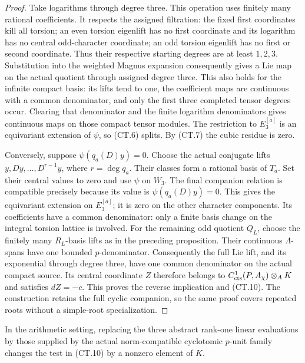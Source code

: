 \begin{proof}
Take logarithms through degree three. This operation uses finitely
many rational coefficients. It respects the assigned filtration:
the fixed first coordinates kill all torsion; an even torsion
eigenlift has no first coordinate and its logarithm has no central
odd-character coordinate; an odd torsion eigenlift has no first
or second coordinate. Thus their respective starting degrees are
at least \(1,2,3\). Substitution into the weighted Magnus
expansion consequently gives a Lie map on the actual quotient
through assigned degree three. This also holds for the infinite
compact basis: its lifts tend to one, the coefficient maps are
continuous with a common denominator, and only the first three
completed tensor degrees occur. Clearing that denominator and
the finite logarithm denominators gives continuous maps on those
compact tensor modules. The restriction to \(E_3^{[a]}\) is an
equivariant extension of \(\psi\), so (CT.6) splits. By (CT.7)
the cubic residue is zero.

Conversely, suppose \(\psi(q_a(D)y)=0\). Choose the actual
conjugate lifts \(y,Dy,\ldots,D^{r-1}y\), where \(r=\deg q_a\).
Their classes form a rational basis of \(T_a\). Set their
central values to zero and use \(\psi\) on \(W_3\). The final
companion relation is compatible precisely because its value is
\(\psi(q_a(D)y)=0\). This gives the equivariant extension on
\(E_3^{[a]}\); it is zero on the other character components.
Its coefficients have a common denominator: only a finite basis
change on the integral torsion lattice is involved. For the
remaining odd quotient \(Q_L\), choose the finitely many
\(R_L\)-basis lifts as in the preceding proposition. Their
continuous \(\Lambda\)-spans have one bounded \(p\)-denominator.
Consequently the full Lie lift, and its exponential through degree
three, have one common denominator on the actual compact source.
Its central coordinate \(Z\) therefore belongs to
\(C^1_{\rm cts}(P,A_\chi)\otimes_A K\) and satisfies \(dZ=-c\).
This proves the reverse implication and (CT.10). The construction
retains the full cyclic companion, so the same proof covers repeated
roots without a simple-root specialization.
\end{proof}

\begin{proposition}
\label{prop:cubic-cyclotomic-inputs}
In the arithmetic setting, replacing the three abstract rank-one
linear evaluations by those supplied by the actual norm-compatible
cyclotomic \(p\)-unit family changes the test in (CT.10) by a
nonzero element of \(K\).
\end{proposition}


